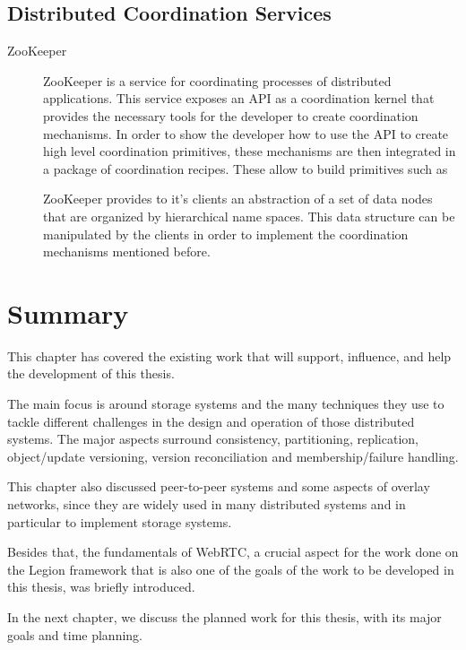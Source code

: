 \subsection{Distributed Coordination Services}

\begin{description}

\item[ZooKeeper ~\cite{zookeeper}] ZooKeeper is a service for coordinating processes of distributed applications. This service exposes an API as a coordination kernel that provides the necessary tools for the developer to create coordination mechanisms. In order to show the developer how to use the API to create high level coordination primitives, these mechanisms are then integrated in a package of coordination recipes. These allow to build primitives such as 
\par
	ZooKeeper provides to it's clients an abstraction of a set of data nodes that are organized by hierarchical name spaces. This data structure can be manipulated by the clients in order to implement the coordination mechanisms mentioned before.

\end{description}

\section{Summary}
\label{sec:summary}
This chapter has covered the existing work that will support, influence, and help the development of this thesis.\par
	The main focus is around storage systems and the many techniques they use to tackle different challenges in the design and operation of those distributed systems. The major aspects surround consistency, partitioning, replication, object/update versioning, version reconciliation and membership/failure handling.\par
	This chapter also discussed peer-to-peer systems and some aspects of overlay networks, since they are widely used in many distributed systems and in particular to implement storage systems.\par
	Besides that, the fundamentals of WebRTC, a crucial aspect for the work done on the Legion framework that is also one of the goals of the work to be developed in this thesis, was briefly introduced.\par
	In the next chapter, we discuss the planned work for this thesis, with its major goals and time planning.